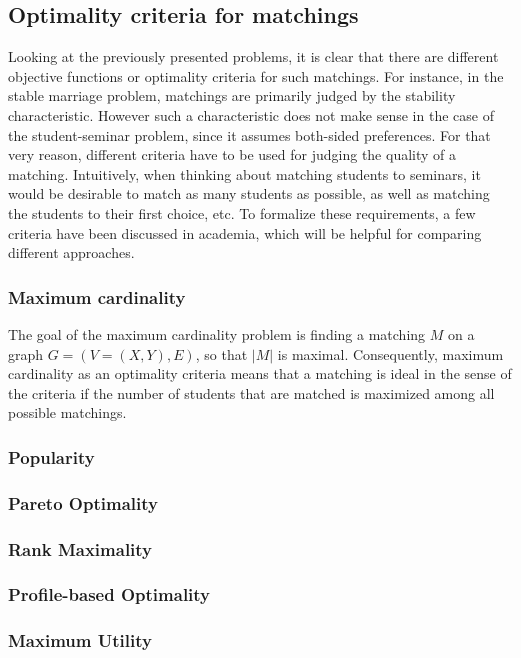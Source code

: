 \subsection{Optimality criteria for matchings}
Looking at the previously presented problems, it is clear that there are different objective functions or optimality criteria for such matchings. For instance, in the stable marriage problem, matchings are primarily judged by the stability characteristic. However such a characteristic does not make sense in the case of the student-seminar problem, since it assumes both-sided preferences. For that very reason, different criteria have to be used for judging the quality of a matching.
\newline
Intuitively, when thinking about matching students to seminars, it would be desirable to match as many students as possible, as well as matching the students to their first choice, etc. To formalize these requirements, a few criteria have been discussed in academia, which will be helpful for comparing different approaches. 

\subsubsection{Maximum cardinality}
The goal of the maximum cardinality problem is finding a matching $M$ on a graph $G=(V=(X, Y), E)$, so that $|M|$ is maximal.\cite{GraphTheoryIntro} Consequently, maximum cardinality as an optimality criteria means that a matching is ideal in the sense of the criteria if the number of students that are matched is maximized among all possible matchings.

\subsubsection{Popularity}

\subsubsection{Pareto Optimality}
\subsubsection{Rank Maximality}
\subsubsection{Profile-based Optimality}
\subsubsection{Maximum Utility}

